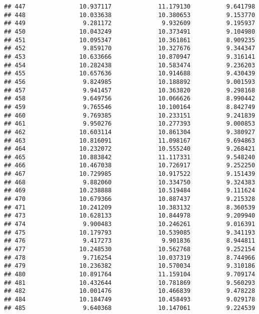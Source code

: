 \documentclass[
]{article}
\begin{document}
\begin{verbatim}
## 447               10.937117             11.179130          9.641798
## 448               10.033638             10.380653          9.153770
## 449                9.281172              9.932609          9.195937
## 450               10.043249             10.373491          9.104980
## 451               10.095347             10.361861          8.909235
## 452                9.859170             10.327676          9.344347
## 453               10.633666             10.870947          9.316141
## 454               10.282438             10.583474          9.236203
## 455               10.657636             10.914688          9.430439
## 456                9.824985             10.188892          9.001593
## 457                9.941457             10.363820          9.298168
## 458                9.649756             10.066626          8.990442
## 459                9.765546             10.100164          8.842749
## 460                9.769385             10.233151          9.241839
## 461                9.950276             10.277393          9.000853
## 462               10.603114             10.861304          9.380927
## 463               10.816091             11.098167          9.694863
## 464               10.232072             10.555240          9.268421
## 465               10.883842             11.117331          9.548240
## 466               10.467038             10.726917          9.252250
## 467               10.729985             10.917522          9.151439
## 468                9.882060             10.334750          9.324383
## 469               10.238888             10.519484          9.111624
## 470               10.679366             10.887437          9.215328
## 471               10.241209             10.383132          8.360539
## 473               10.628133             10.844978          9.209940
## 474                9.900483             10.246261          9.016391
## 475               10.179793             10.539085          9.341193
## 476                9.417273              9.901836          8.944811
## 477               10.248530             10.562768          9.252154
## 478                9.716254             10.037319          8.744966
## 479               10.236382             10.570034          9.310186
## 480               10.891764             11.159104          9.709174
## 481               10.432644             10.781869          9.560293
## 482               10.001476             10.466839          9.478228
## 484               10.184749             10.458493          9.029178
## 485                9.640368             10.147061          9.224539

\end{verbatim}
\end{document}
